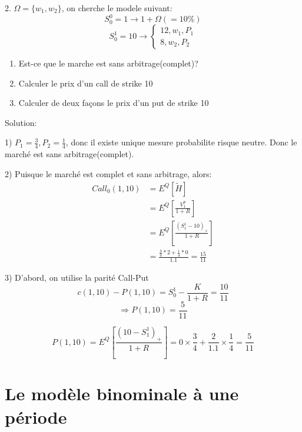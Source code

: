 \documentclass{article}
\theoremstyle{plain}
\theoremstyle{definition}
\begin{document}
2. $\Omega=\{w_1, w_2\}$, on cherche le modele suivant:
\begin{equation}
	S_0^0=1 \rightarrow 1+\Omega(=10\%)
\end{equation}
\begin{equation}
	S_0^1=10\rightarrow
	\left\{\begin{array}{rc}
		12, w_1, P_1\\
		8, w_2, P_2
	\end{array}\right.
\end{equation}

\begin{enumerate}
\item Est-ce que le marche est sans arbitrage(complet)?
\item Calculer le prix d'un call de strike 10
\item Calculer de deux fa\c{c}ons le prix d'un put de strike 10
\end{enumerate}

Solution:

1) $P_1=\frac{3}{4}, P_2=\frac{1}{4}$, donc il existe unique mesure probabilite risque neutre. Donc le march\'e est sans arbitrage(complet).

2) Puisque le march\'e est complet et sans arbitrage, alors:
\begin{equation}
\begin{split}
	Call_0(1,10) &= E^Q[\tilde{H}] \\
	&= E^Q[\frac{V_1^\theta}{1+R}] \\
	&= E^Q[\frac{(S_1^1-10)_+}{1+R}]\\
	&=\frac{\frac{3}{4}*2+\frac{1}{4}*0}{1.1}=\frac{15}{11}
\end{split}
\end{equation}

3) 
D'abord, on utilise la parit\'e Call-Put
\begin{equation}
c(1,10)-P(1,10)=S_0^1-\frac{K}{1+R}=\frac{10}{11}
\end{equation}
\begin{equation}
\Rightarrow P(1,10)=\frac{5}{11}
\end{equation}

\begin{equation}
P(1,10) = E^Q[\frac{(10-S_1^1)_+}{1+R}]=0\times\frac{3}{4}+\frac{2}{1.1}\times\frac{1}{4}=\frac{5}{11}
\end{equation}

\section{Le mod\`ele binominale \`a une p\'eriode}
\end{document}
